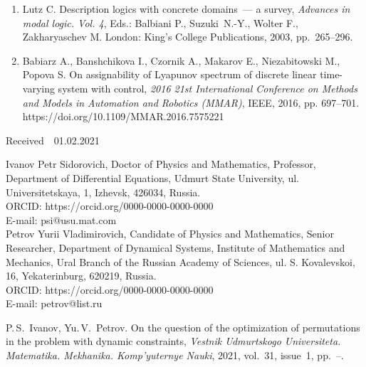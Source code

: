 \documentclass[12pt,a4paper,twoside]{article}  %
\makeatletter
\def\receivedeng{\begin{otherlanguage}{english}\vspace{3ex} \hfill Received~~\datereceive \par \vspace{5ex} \par\end{otherlanguage}}
\def\contactseng{\begin{otherlanguage}{english}\noindent\parbox{\textwidth}{\small\noindent\contactinformationeng\par\vspace{10pt}\par
			\noindent{\bf Citation: }\authorseng. \articletitleeng, {\it Vestnik Udmurtskogo Universiteta. Matematika. Mekhanika. Komp'yuternye Nauki}, \paperyear, vol.~\papervolume, issue~\papernumber, \mbox{pp.~\pageref{paperfirstpage}--\pageref{paperlastpage}.}}\label{paperlastpage}\end{otherlanguage}}
\newcommand{\paperyear}{2021} %
\newcommand{\papervolume}{31} %
\newcommand{\papernumber}{1}  %
\newcommand{\authorseng}{P.\,S.~Ivanov, Yu.\,V.~Petrov} %
\newcommand{\articletitleeng}{On the question of the optimization of permutations in the problem with dynamic constraints}
\newcommand{\datereceive}{01.02.2021} %
\newcommand{\contactinformationeng}{Ivanov Petr Sidorovich,
Doctor of Physics and Mathematics, Professor, Department of Differential Equations,
Udmurt State University, ul. Universitetskaya, 1, Izhevsk, 426034, Russia. \\
ORCID: https://orcid.org/0000-0000-0000-0000 \\
E-mail: psi@usu.mat.com \\ [5pt]
Petrov Yurii Vladimirovich, Candidate of Physics and Mathematics, Senior Researcher, Department of Dynamical Systems,
Institute of Mathematics and Mechanics, Ural Branch of the Russian Academy of Sciences, ul. S. Kovalevskoi, 16, Yekaterinburg, 620219,  Russia. \\
ORCID: https://orcid.org/0000-0000-0000-0000 \\
E-mail: petrov@list.ru
}
\makeatother
\begin{document}
\begin{enumerate}

\item
Lutz C.
Description logics with concrete domains~--- a survey,
{\it Advances in modal logic. Vol. 4},
Eds.: Balbiani P., Suzuki~N.-Y., Wolter F., Zakharyaschev M.
London: King's College Publications, 2003, pp.~265--296.


\item
Babiarz A., Banshchikova I., Czornik A., Makarov E., Niezabitowski M., Popova S. On assignability
of Lyapunov spectrum of discrete linear time-varying system with control, {\it 2016 21st International
Conference on Methods and Models in Automation and Robotics (MMAR)}, IEEE, 2016, pp. 697--701.
https://doi.org/10.1109/MMAR.2016.7575221

\end{enumerate}

\receivedeng

\contactseng
\end{document}
